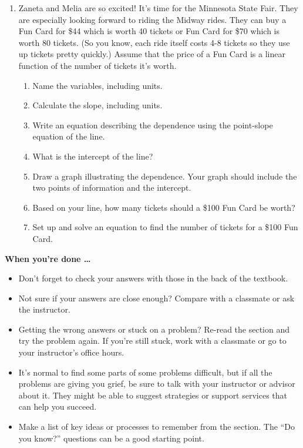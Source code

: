 \begin{enumerate}
\item %
Zaneta and Melia are so excited!  It's time for the Minnesota State Fair.  They are especially looking forward to riding the Midway rides.  They can buy a Fun Card for \$44 which is worth 40 tickets or Fun Card for \$70 which is worth 80 tickets. (So you know, each ride itself costs 4-8 tickets so they use up tickets pretty quickly.)  Assume that the price of a Fun Card is a linear function of the number of tickets it's worth.
\begin{enumerate}
   \item Name the variables, including units.
   \item Calculate the slope, including units.
   \item Write an equation describing the dependence using the point-slope equation of the line.
   \item What is the intercept of the line?
   \item Draw a graph illustrating the dependence. Your graph should include the two points of information and the intercept.
    \item Based on your line, how many tickets should a \$100 Fun Card be worth?
    \item Set up and solve an equation to find the number of tickets for a \$100 Fun Card.
\end{enumerate}

\end{enumerate}

\bigskip

\noindent \textbf{When you're done \ldots}

\begin{itemize}
\item Don't forget to check your answers with those in the back of the textbook. 
\item Not sure if your answers are close enough? Compare with a classmate or ask the instructor.  
\item Getting the wrong answers or stuck on a problem?  Re-read the section and try the problem again.   If you're still stuck, work with a classmate or go to your instructor's office hours.
\item It's normal to find some parts of some problems difficult, but if all the problems are giving you grief, be sure to talk with your instructor or advisor about it.  They might be able to suggest strategies or support services that can help you succeed.
\item Make a list of key ideas or processes to remember from the section.  The ``Do you know?'' questions can be a good starting point.
\end{itemize}



